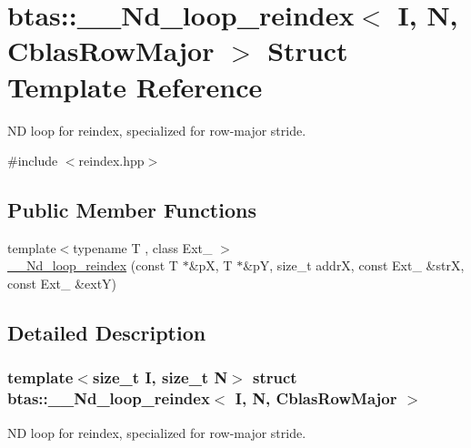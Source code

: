 \hypertarget{structbtas_1_1_____nd__loop__reindex_3_01_i_00_01_n_00_01_cblas_row_major_01_4}{
\section{btas::\_\-\_\-Nd\_\-loop\_\-reindex$<$ I, N, CblasRowMajor $>$ Struct Template Reference}
\label{structbtas_1_1_____nd__loop__reindex_3_01_i_00_01_n_00_01_cblas_row_major_01_4}
}


ND loop for reindex, specialized for row-\/major stride.  


{\ttfamily \#include $<$reindex.hpp$>$}\subsection*{Public Member Functions}
\begin{DoxyCompactItemize}
\item 
{\footnotesize template$<$typename T , class Ext\_\- $>$ }\\\hyperlink{structbtas_1_1_____nd__loop__reindex_3_01_i_00_01_n_00_01_cblas_row_major_01_4_a922a5181568a6345d828f51f2d289d5d}{\_\-\_\-Nd\_\-loop\_\-reindex} (const T $\ast$\&pX, T $\ast$\&pY, size\_\-t addrX, const Ext\_\- \&strX, const Ext\_\- \&extY)
\end{DoxyCompactItemize}


\subsection{Detailed Description}
\subsubsection*{template$<$size\_\-t I, size\_\-t N$>$ struct btas::\_\-\_\-Nd\_\-loop\_\-reindex$<$ I, N, CblasRowMajor $>$}

ND loop for reindex, specialized for row-\/major stride. 

